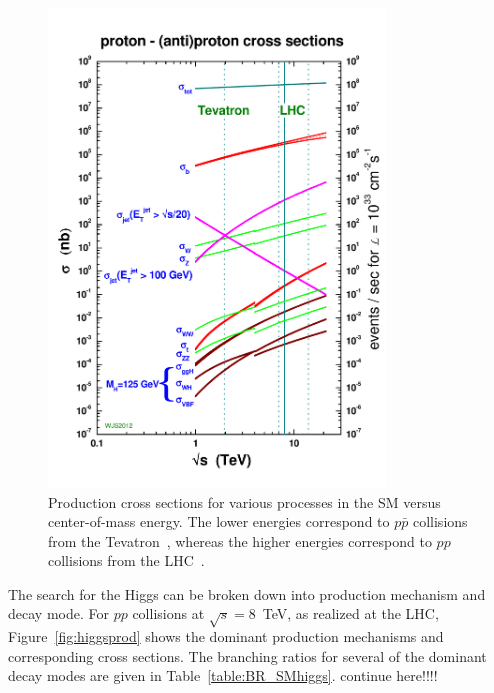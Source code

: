 \begin{figure}[ht]
 \begin{center}
    \includegraphics[width=0.80\textwidth]{figures/intro/crosssections2012_v5.pdf}
      \end{center}
\caption{Production cross sections for various processes in the SM versus center-of-mass energy.
The lower energies correspond to $p\bar{p}$ collisions from the Tevatron~\cite{Group:1984bk}, whereas
the higher energies correspond to $pp$ collisions from the LHC~\cite{cern-jinst-lhc}.}
\label{fig:crosssections}
\end{figure}

The search for the Higgs can be broken down into production mechanism and decay mode. For $pp$
collisions at $\sqrt{s} = 8$~TeV, as realized at the LHC, Figure~\ref{fig:higgsprod} shows the
dominant production mechanisms and corresponding cross sections. The branching ratios for several
of the dominant decay modes are given in Table~\ref{table:BR_SMhiggs}. continue here!!!!

